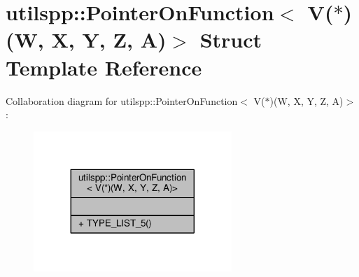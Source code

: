 \hypertarget{structutilspp_1_1PointerOnFunction_3_01V_07_5_08_07W_00_01X_00_01Y_00_01Z_00_01A_08_4}{\section{utilspp\-:\-:Pointer\-On\-Function$<$ V($\ast$)(W, X, Y, Z, A)$>$ Struct Template Reference}
\label{structutilspp_1_1PointerOnFunction_3_01V_07_5_08_07W_00_01X_00_01Y_00_01Z_00_01A_08_4}
}


Collaboration diagram for utilspp\-:\-:Pointer\-On\-Function$<$ V($\ast$)(W, X, Y, Z, A)$>$\-:\nopagebreak
\begin{figure}[H]
\begin{center}
\leavevmode
\includegraphics[width=212pt]{structutilspp_1_1PointerOnFunction_3_01V_07_5_08_07W_00_01X_00_01Y_00_01Z_00_01A_08_4__coll__graph}
\end{center}
\end{figure}
